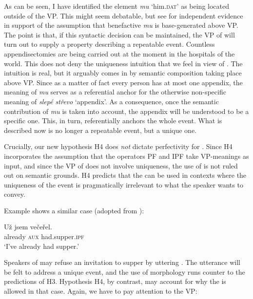 \documentclass[output=paper,modfonts,newtxmath,hidelinks]{langscibook}
\begin{document}
\noindent As can be seen, I have identified the element \textit{mu} `him.\textsc{dat}’ as being located outside of the VP. This might seem debatable, but see \citet{Dvorak10} for independent evidence in support of the assumption that benefactive \textit{mu} is 
base-generated above VP. 
The point is that, if this syntactic decision can be maintained, 
the VP of  will turn out to supply a property describing a repeatable event. Countless appendisectomies 
are being carried out at the moment in the hospitals of the world.  
This does not deny the uniqueness intuition that we feel in view of . The intuition is real, but it arguably comes in 
by semantic composition taking place above VP. Since as a matter of fact every person has at most one appendix, 
the meaning of \textit{mu} serves as a referential anchor for the 
otherwise non-specific meaning of \textit{slep\'e st\v{r}evo} `appendix’. As a consequence, once the semantic contribution of \textit{mu} is taken into account, 
the appendix will be understood to be a specific one. This, in turn, referentially anchors the whole event.
What is described now is no longer a repeatable event, but a unique one. 

Crucially, our new hypothesis H4 does \textit{not} dictate perfectivity for . Since H4 incorporates the assumption that the  operators PF and IPF take VP-meanings as input, and since the VP of
 does not involve uniqueness, the use of  is not ruled out on
semantic grounds. H4 predicts that the  can be used in contexts where the uniqueness of the event is pragmatically irrelevant to what the speaker wants to convey.

Example  shows a similar case (adopted from \citealt{Cummins1987}): 


\begin{exe}
\ex\label{13:abendessen}
\gll U\v{z} jsem ve\v{c}e\v{r}el. \\
already \textsc{aux} had.supper.\textsc{ipf} \\
\glt `I've already had supper.'
\end{exe}

\noindent Speakers of  may refuse an invitation to supper by uttering . The utterance will be felt 
to address a unique event, and the use of  morphology runs counter to the predictions of H3. Hypothesis H4,  
by contrast, may account for why the  is allowed in that case. Again, we have to pay attention to the VP:
\end{document}
